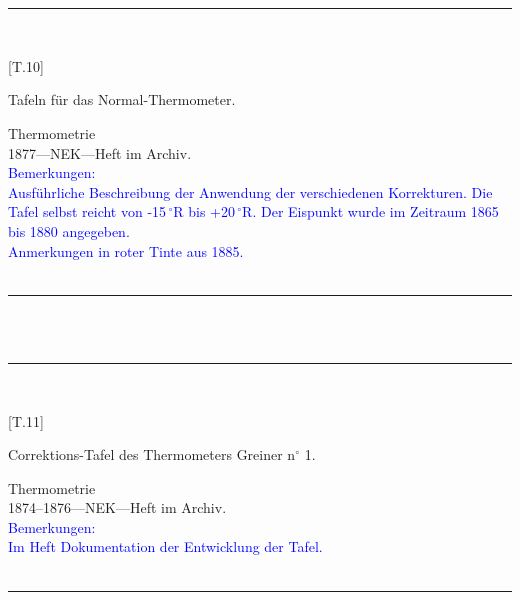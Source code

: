 \\
\vspace*{-2.5pt}\\
\parbox{\textwidth}{%
\rule{\textwidth}{1pt}\vspace*{-3mm}\\
\begin{minipage}[t]{0.22\textwidth}\vspace{0pt}
\Huge\rule[-4mm]{0cm}{1cm}[T.10]
\end{minipage}
\hfill
\begin{minipage}[t]{0.78\textwidth}\vspace{0pt}
\large Tafeln für das Normal-Thermometer.\rule[-2mm]{0mm}{2mm}
\end{minipage}
{\footnotesize\flushright
Thermometrie\\
}
1877\quad---\quad NEK\quad---\quad Heft im Archiv.\\
\textcolor{blue}{Bemerkungen:\\{}
Ausführliche Beschreibung der Anwendung der verschiedenen Korrekturen. Die Tafel selbst reicht von -15\,{$^\circ$}R bis +20\,{$^\circ$}R. Der Eispunkt wurde im Zeitraum 1865 bis 1880 angegeben.\\{}
Anmerkungen in roter Tinte aus 1885.\\{}
}
\\[-15pt]
\rule{\textwidth}{1pt}
}
\\
\vspace*{-2.5pt}\\
\parbox{\textwidth}{%
\rule{\textwidth}{1pt}\vspace*{-3mm}\\
\begin{minipage}[t]{0.22\textwidth}\vspace{0pt}
\Huge\rule[-4mm]{0cm}{1cm}[T.11]
\end{minipage}
\hfill
\begin{minipage}[t]{0.78\textwidth}\vspace{0pt}
\large Correktions-Tafel des Thermometers Greiner n{$^\circ$} 1.\rule[-2mm]{0mm}{2mm}
\end{minipage}
{\footnotesize\flushright
Thermometrie\\
}
1874--1876\quad---\quad NEK\quad---\quad Heft im Archiv.\\
\textcolor{blue}{Bemerkungen:\\{}
Im Heft Dokumentation der Entwicklung der Tafel.\\{}
}
\\[-15pt]
\rule{\textwidth}{1pt}
}
